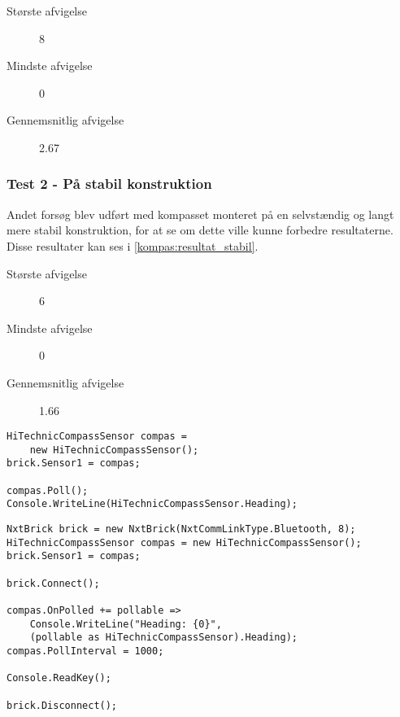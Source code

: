 \begin{description}
\item[Største afvigelse]{8\dg}
\item[Mindste afvigelse]{0\dg}
\item[Gennemsnitlig afvigelse]{2.67}
\end{description}

\subsubsection{Test 2 - På stabil konstruktion}
Andet forsøg blev udført med kompasset monteret på en selvstændig og langt mere stabil konstruktion, for at se om dette ville kunne forbedre resultaterne.
Disse resultater kan ses i \cref{kompas:resultat_stabil}.

\begin{description}
\item[Største afvigelse]{6\dg}
\item[Mindste afvigelse]{0\dg}
\item[Gennemsnitlig afvigelse]{1.66}
\end{description}

\begin{lstlisting}[style=csharpsmall,caption={Et eksempel på brug af Compass Sensor},label=compass:example,frame=single]
HiTechnicCompassSensor compas =
	new HiTechnicCompassSensor();
brick.Sensor1 = compas;

compas.Poll();
Console.WriteLine(HiTechnicCompassSensor.Heading);
\end{lstlisting}

\begin{lstlisting}[style=csharpsmall,caption={Kode brugt til test},label=compass:test,frame=single]
NxtBrick brick = new NxtBrick(NxtCommLinkType.Bluetooth, 8);
HiTechnicCompassSensor compas = new HiTechnicCompassSensor();
brick.Sensor1 = compas;

brick.Connect();

compas.OnPolled += pollable =>
	Console.WriteLine("Heading: {0}",
	(pollable as HiTechnicCompassSensor).Heading);
compas.PollInterval = 1000;

Console.ReadKey();

brick.Disconnect();
\end{lstlisting}

